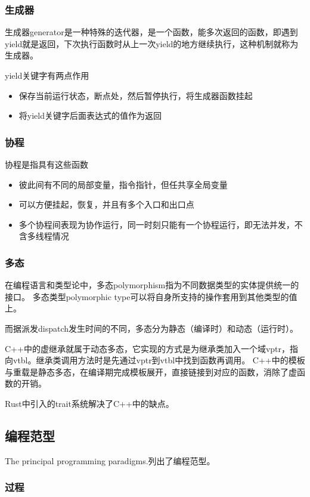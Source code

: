 \subsubsection{生成器}
生成器generator是一种特殊的迭代器，是一个函数，能多次返回的函数，即遇到yield就是返回，下次执行函数时从上一次yield的地方继续执行，这种机制就称为生成器。

yield关键字有两点作用
\begin{itemize}
    \item {保存当前运行状态，断点处，然后暂停执行，将生成器函数挂起}
    \item {将yield关键字后面表达式的值作为返回}
\end{itemize}

\subsubsection{协程}
协程是指具有这些函数
\begin{itemize}
    \item {彼此间有不同的局部变量，指令指针，但任共享全局变量}
    \item {可以方便挂起，恢复，并且有多个入口和出口点}
    \item {多个协程间表现为协作运行，同一时刻只能有一个协程运行，即无法并发，不含多线程情况}
\end{itemize}

\subsubsection{多态}
在编程语言和类型论中，多态polymorphism指为不同数据类型的实体提供统一的接口。
多态类型polymorphic type可以将自身所支持的操作套用到其他类型的值上。

而据派发dispatch发生时间的不同，多态分为静态（编译时）和动态（运行时）。

C++中的虚继承就属于动态多态，它实现的方式是为继承类加入一个域vptr，指向vtbl。继承类调用方法时是先通过vptr到vtbl中找到函数再调用。
C++中的模板与重载是静态多态，在编译期完成模板展开，直接链接到对应的函数，消除了虚函数的开销。

Rust中引入的trait系统解决了C++中的缺点。


\subsection{编程范型}
The principal programming paradigms.\cite{TPPP}列出了编程范型。

\subsubsection{过程}

